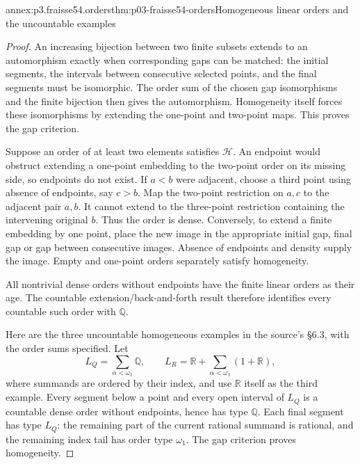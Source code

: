\begin{annexitem}{annex:p3.fraisse54.orders}{thm:p03-fraisse54-orders}{Homogeneous linear orders and the uncountable examples}
\begin{proof}
An increasing bijection between two finite subsets extends to an
automorphism exactly when corresponding gaps can be matched: the initial
segments, the intervals between consecutive selected points, and the final
segments must be isomorphic. The order sum of the chosen gap isomorphisms
and the finite bijection then gives the automorphism. Homogeneity itself
forces these isomorphisms by extending the one-point and two-point maps.
This proves the gap criterion.

Suppose an order of at least two elements satisfies \(\mathcal H\).
An endpoint would obstruct extending a one-point embedding to the
two-point order on its missing side, so endpoints do not exist. If
\(a<b\) were adjacent, choose a third point using absence of endpoints,
say \(c>b\). Map the two-point restriction on \(a,c\) to the adjacent
pair \(a,b\). It cannot extend to the three-point restriction containing
the intervening original \(b\). Thus the order is dense. Conversely,
to extend a finite embedding by one point, place the new image in the
appropriate initial gap, final gap or gap between consecutive images.
Absence of endpoints and density supply the image. Empty and one-point
orders separately satisfy homogeneity.

All nontrivial dense orders without endpoints have the finite linear
orders as their age. The countable extension/back-and-forth result therefore
identifies every countable such order with \(\mathbb Q\).

Here are the three uncountable homogeneous examples in the source's
\S6.3, with the order sums specified. Let
\[
 L_Q=\sum_{\alpha<\omega_1}\mathbb Q,
 \qquad
 L_R=\mathbb R+\sum_{\alpha<\omega_1}(1+\mathbb R),
\]
where summands are ordered by their index, and use \(\mathbb R\) itself
as the third example. Every segment below a point and every open interval
of \(L_Q\) is a countable dense order without endpoints, hence has type
\(\mathbb Q\). Each final segment has type \(L_Q\): the remaining part
of the current rational summand is rational, and the remaining index tail
has order type \(\omega_1\). The gap criterion proves homogeneity.


\end{proof}
\end{annexitem}
